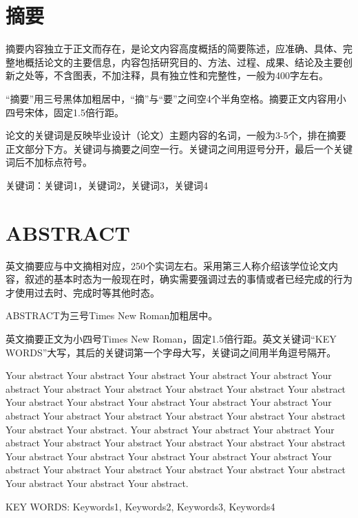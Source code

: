 \newpage

\section*{摘\qquad 要}
\setcounter{page}{1}
\thispagestyle{plain}

\lfoot{}
\cfoot{~~~\footnotesize\thepage~~~}
\rfoot{}
\begin{spacing}{1.5}
    \xiaosihao\songti
    摘要内容独立于正文而存在，是论文内容高度概括的简要陈述，应准确、具体、完整地概括论文的主要信息，内容包括研究目的、方法、过程、成果、结论及主要创新之处等，不含图表，不加注释，具有独立性和完整性，一般为400字左右。
    
    “摘要”用三号黑体加粗居中，“摘”与“要”之间空4个半角空格。摘要正文内容用小四号宋体，固定1.5倍行距。
    
    论文的关键词是反映毕业设计（论文）主题内容的名词，一般为3-5个，排在摘要正文部分下方。关键词与摘要之间空一行。关键词之间用逗号分开，最后一个关键词后不加标点符号。
    
    
    \vspace*{3ex}\noindent 关键词：关键词1，关键词2，关键词3，关键词4
    
    
    \newpage
    \section*{ABSTRACT}
    \thispagestyle{plain}
    \lfoot{}
    \cfoot{~~~\footnotesize\thepage~~~}
    \rfoot{}
    英文摘要应与中文摘相对应，250个实词左右。采用第三人称介绍该学位论文内容，叙述的基本时态为一般现在时，确实需要强调过去的事情或者已经完成的行为才使用过去时、完成时等其他时态。
    
    ABSTRACT为三号Times New Roman加粗居中。
    
    英文摘要正文为小四号Times New Roman，固定1.5倍行距。英文关键词“KEY WORDS”大写，其后的关键词第一个字母大写，关键词之间用半角逗号隔开。
    
    Your abstract Your abstract Your abstract Your abstract Your abstract Your abstract Your abstract Your abstract Your abstract Your abstract Your abstract Your abstract Your abstract Your abstract Your abstract Your abstract Your abstract Your abstract Your abstract Your abstract Your abstract Your abstract Your abstract Your abstract. Your abstract Your abstract Your abstract Your abstract Your abstract Your abstract Your abstract Your abstract Your abstract Your abstract Your abstract Your abstract Your abstract Your abstract Your abstract Your abstract Your abstract Your abstract Your abstract Your abstract Your abstract Your abstract Your abstract.
    
    \vspace*{3ex}KEY WORDS: Keywords1, Keywords2, Keywords3, Keywords4    
\end{spacing}
